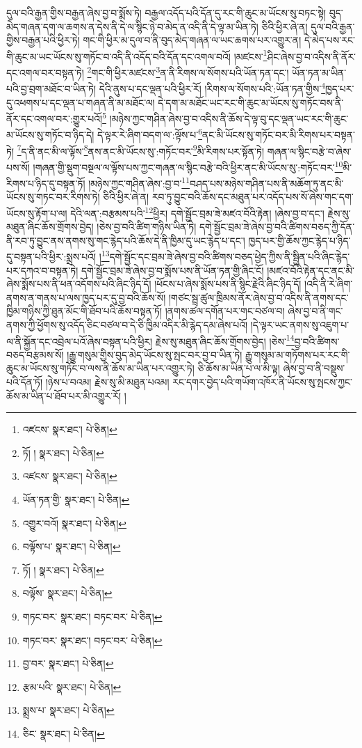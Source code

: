 དུལ་བའི་རྒྱན་གྱིས་བརྒྱན་ཞེས་བྱ་བ་སྨོས་ཏེ། བརྒྱལ་འདོད་པའི་དོན་དུ་རང་གི་ཆུང་མ་ཡོངས་སུ་བཏང་སྟེ། བུད་མེད་གཞན་དག་ལ་ཆགས་ན་དེས་ནི་དེ་ལ་སྙིང་ཉེ་བ་མེད་ན་འདི་ནི་དེ་ལྟ་མ་ཡིན་ཏེ། ཅིའི་ཕྱིར་ཞེ་ན། དུལ་བའི་རྒྱན་གྱིས་བརྒྱན་པའི་ཕྱིར་ཏེ། གང་གི་ཕྱིར་མ་དུལ་བ་ནི་བུད་མེད་གཞན་ལ་ཡང་ཆགས་པར་འགྱུར་ན། དེ་མེད་པས་རང་གི་ཆུང་མ་ཡང་ཡོངས་སུ་གཏོང་བ་འདི་ནི་འདོད་བའི་དོན་དང་འགལ་བའོ། །མཛངས་\footnote{འཛངས་  སྣར་ཐང་།  པེ་ཅིན། }ཤིང་ཞེས་བྱ་བ་འདིས་ནི་ནོར་དང་འགལ་བར་བསྟན་ཏེ། \footnote{ཏོ། །   སྣར་ཐང་།  པེ་ཅིན། }གང་གི་ཕྱིར་མཛངས་\footnote{འཛངས་  སྣར་ཐང་།  པེ་ཅིན། }ན་ནི་རིགས་ལ་སོགས་པའི་ཡོན་ཏན་དང་། ཡོན་ཏན་མ་ཡིན་པའི་བྱ་བྲག་མཐོང་བ་ཡིན་ཏེ། དེའི་ནུས་པ་དང་ལྡན་པའི་ཕྱིར་རོ། །རིགས་ལ་སོགས་པའི་:ཡོན་ཏན་གྱིས་\footnote{ཡོན་ཏན་གྱི་  སྣར་ཐང་།  པེ་ཅིན། }ཁྱད་པར་དུ་འཕགས་པ་དང་ལྡན་པ་གཞན་ནི་མ་མཐོང་ལ། དེ་དག་མ་མཐོང་ཡང་རང་གི་ཆུང་མ་ཡོངས་སུ་གཏོང་བས་ནི་ནོར་དང་འགལ་བར་:གྱུར་པའོ།\footnote{འགྱུར་བའོ།  སྣར་ཐང་།  པེ་ཅིན། } །མཉེས་ཀྱང་གཤིན་ཞེས་བྱ་བ་འདིས་ནི་ཆོས་དེ་ལྟ་བུ་དང་ལྡན་ཡང་རང་གི་ཆུང་མ་ཡོངས་སུ་གཏོང་བ་ཉིད་དེ། དེ་ལྟར་རེ་ཞིག་བདག་ལ་:ལྟོས་པ་\footnote{བལྟོས་པ་  སྣར་ཐང་།  པེ་ཅིན། }ནང་མི་ཡོངས་སུ་གཏོང་བར་མི་རིགས་པར་བསྟན་ཏེ། \footnote{ཏོ། །   སྣར་ཐང་།  པེ་ཅིན། }ད་ནི་ནང་མི་ལ་ལྟོས་\footnote{བལྟོས་  སྣར་ཐང་།  པེ་ཅིན། }ནས་ནང་མི་ཡོངས་སུ་:གཏོང་བར་\footnote{གཏང་བར་  སྣར་ཐང་། བཏང་བར་  པེ་ཅིན། }མི་རིགས་པར་སྟོན་ཏེ། གཞན་ལ་སྙིང་བརྩེ་བ་ཞེས་པས་སོ། །གཞན་གྱི་སྡུག་བསྔལ་ལ་ལྟོས་པས་ཀྱང་གཞན་ལ་སྙིང་བརྩེ་བའི་ཕྱིར་ནང་མི་ཡོངས་སུ་:གཏོང་བར་\footnote{གཏང་བར་  སྣར་ཐང་། བཏང་བར་  པེ་ཅིན། }མི་རིགས་པ་ཉིད་དུ་བསྟན་ཏོ། །མཉེས་ཀྱང་གཤིན་ཞེས་:བྱ་བ་\footnote{བྱ་བར་  སྣར་ཐང་།  པེ་ཅིན། }བཤད་པས་མཉེས་གཤིན་པས་ནི་མཆོག་ཏུ་ནང་མི་ཡོངས་སུ་གཏང་བར་རིགས་ཏེ། ཅིའི་ཕྱིར་ཞེ་ན། རབ་ཏུ་བྱུང་བའི་ཆོས་དང་མཐུན་པར་འདོད་པས་སོ་ཞེས་གང་དག་ཡོངས་སུ་རྟོག་པ་ལ། དེའི་ལན་:བརྩམས་པའི་\footnote{རྩམ་པའི་  སྣར་ཐང་།  པེ་ཅིན། }ཕྱིར། དགེ་སྦྱོང་བྲམ་ཟེ་མཛའ་བོའི་རྟེན། །ཞེས་བྱ་བ་དང་། རྗེས་སུ་མཐུན་ཞིང་ཆོས་གྲོགས་བྱེད། །ཅེས་བྱ་བའི་ཚིག་གཉིས་ཡིན་ཏེ། དགེ་སྦྱོང་བྲམ་ཟེ་ཞེས་བྱ་བའི་ཚིགས་བཅད་ཀྱི་དོན་ནི་རབ་ཏུ་བྱུང་ནས་ནགས་སུ་གང་རྙེད་པའི་ཆོས་དེ་ནི་ཁྱིམ་དུ་ཡང་རྙེད་པ་དང་། ཁྱད་པར་གྱི་ཆོས་ཀྱང་རྙེད་པ་ཉིད་དུ་བསྟན་པའི་ཕྱིར་:སྨྲས་པའོ། །\footnote{སྨྲས་པ་  སྣར་ཐང་།  པེ་ཅིན། }དགེ་སྦྱོང་དང་བྲམ་ཟེ་ཞེས་བྱ་བའི་ཚིགས་བཅད་ཕྱེད་ཀྱིས་ནི་སྦྱིན་པའི་ཞིང་རྙེད་པར་དཀའ་བ་བསྟན་ཏེ། དགེ་སྦྱོང་བྲམ་ཟེ་ཞེས་བྱ་བ་སྨོས་པས་ནི་ཡོན་ཏན་གྱི་ཞིང་ངོ། །མཛའ་བོའི་རྟེན་དང་ནང་མི་ཞེས་སྨོས་པས་ནི་ཕན་འདོགས་པའི་ཞིང་ཉིད་དོ། །ཕོངས་པ་ཞེས་སྨོས་པས་ནི་སྙིང་རྗེའི་ཞིང་ཉིད་དོ། །འདི་ནི་རེ་ཞིག་ནགས་ན་གནས་པ་ལས་ཁྱད་པར་དུ་བྱ་བའི་ཆོས་སོ། །གཙང་སྦྲ་ཚུལ་ཁྲིམས་ནོར་ཞེས་བྱ་བ་འདིས་ནི་ནགས་དང་ཁྱིམ་གཉིས་ཀྱི་ཐུན་མོང་གི་ཐོབ་པའི་ཆོས་བསྟན་ཏོ། །ནགས་ཚལ་དགོན་པར་གང་བཙལ་བ། ཞེས་བྱ་བ་ནི་གང་ནགས་ཀྱི་ཕྱོགས་སུ་འདོད་ཅིང་བཙལ་བ་དེ་ཅི་ཁྱིམ་འདིར་མི་རྙེད་དམ་ཞེས་པའོ། །དེ་ལྟར་ཡང་ནགས་སུ་འཇུག་པ་ལ་ནི་སྐྱོན་དང་འབྲེལ་པའོ་ཞེས་བསྟན་པའི་ཕྱིར། རྗེས་སུ་མཐུན་ཞིང་ཆོས་གྲོགས་བྱེད། །ཅེས་\footnote{ཅིང་  སྣར་ཐང་།  པེ་ཅིན། }བྱ་བའི་ཚིགས་བཅད་བརྩམས་སོ། །རྒྱུ་གསུམ་གྱིས་བུད་མེད་ཡོངས་སུ་སྤང་བར་བྱ་བ་ཡིན་ཏེ། རྒྱུ་གསུམ་མ་གཏོགས་པར་རང་གི་ཆུང་མ་ཡོངས་སུ་གཏོང་བ་ལས་ནི་ཆོས་མ་ཡིན་པར་འགྱུར་ཏེ། ཅི་ཆོས་མ་ཡིན་པ་ལ་མི་ལྟ། ཞེས་བྱ་བ་ནི་བསྡུས་པའི་དོན་ཏོ། །ཉེས་པ་བའམ། རྗེས་སུ་མི་མཐུན་པའམ། རང་དགར་བྱེད་པའི་གཡོག་འཁོར་ནི་ཡོངས་སུ་སྤངས་ཀྱང་ཆོས་མ་ཡིན་པ་ཐོབ་པར་མི་འགྱུར་རོ། །
